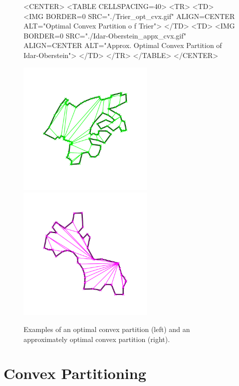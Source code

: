 \begin{figure}
\begin{ccHtmlOnly}
<CENTER>
<TABLE CELLSPACING=40>
<TR>
<TD>
<IMG BORDER=0 SRC="./Trier_opt_cvx.gif" ALIGN=CENTER ALT="Optimal Convex Partition o
f Trier">
</TD>
<TD>
<IMG BORDER=0 SRC="./Idar-Oberstein_appx_cvx.gif" ALIGN=CENTER ALT="Approx. Optimal
Convex Partition of Idar-Oberstein">
</TD>
</TR>
</TABLE>
</CENTER>
\end{ccHtmlOnly}

\begin{ccTexOnly}
\begin{center}
\includegraphics[width=6.5cm]{Partition_2/Trier_opt_cvx}
\includegraphics[width=6.5cm]{Partition_2/Idar-Oberstein_appx_cvx}
\end{center}
\end{ccTexOnly}
\caption{Examples of an optimal convex partition (left) and an approximately
optimal convex partition (right).}
\end{figure}


\section{Convex Partitioning}
\label{sec:partition_2_convex}


